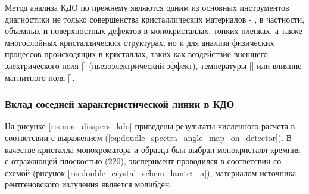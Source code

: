 Метод анализа КДО по прежнему являются одним из основных инструментов диагностики не только совершенства
кристаллических материалов \cite{sov_1} - \cite{sov_5}, в частности, объемных и поверхностных дефектов в
монокристаллах, тонких пленках, а также многослойных кристаллических структурах, но и для анализа физических
процессов происходящих в кристаллах, таких как воздействие внешнего электрического поля [] (пьезоэлектрический эффект),
 температуры [] или влияние магнитного поля [].

\subsubsection{Вклад соседней характеристической линии в КДО}

\label{sec:non_disspers_KDO_section}
На рисунке \ref{ris:non_disspers_kdo} приведены результаты численного расчета в соответсвии
с выражением (\ref{eq:doudle_spectra_angle_map_on_detector}). В качестве кристалла монохроматора
и образца был выбран монокристалл кремния с отражающей плоскостью (220), эксперимент проводился в
соответсвии со схемой (рисунок \ref{ris:double_crystal_schem_lamtet_a}), материалом источника рентгеновского излучения является молибден.

